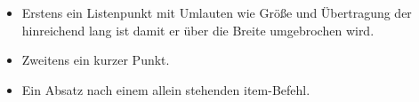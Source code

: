 \begin{itemize}
\item Erstens ein Listenpunkt mit Umlauten wie Größe und Übertragung der hinreichend lang ist damit er über die Breite umgebrochen wird.
\item Zweitens ein kurzer Punkt.
\item
Ein Absatz nach einem allein stehenden item-Befehl.
\end{itemize}
